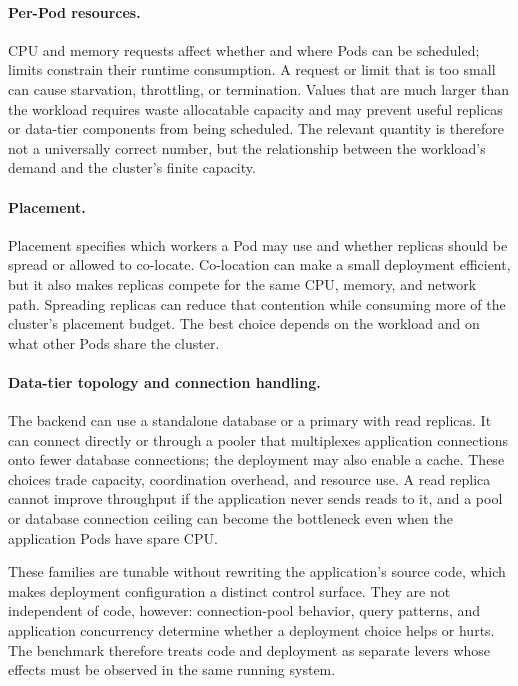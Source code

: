 \paragraph{Per-Pod resources.}
CPU and memory requests affect whether and where Pods can be scheduled;
limits constrain their runtime consumption. A request or limit that is too
small can cause starvation, throttling, or termination. Values that are much
larger than the workload requires waste allocatable capacity and may prevent
useful replicas or data-tier components from being scheduled. The relevant
quantity is therefore not a universally correct number, but the relationship
between the workload's demand and the cluster's finite capacity.

\paragraph{Placement.}
Placement specifies which workers a Pod may use and whether replicas should be
spread or allowed to co-locate. Co-location can make a small deployment
efficient, but it also makes replicas compete for the same CPU, memory, and
network path. Spreading replicas can reduce that contention while consuming
more of the cluster's placement budget. The best choice depends on the
workload and on what other Pods share the cluster.

\paragraph{Data-tier topology and connection handling.}
The backend can use a standalone database or a primary with read replicas. It
can connect directly or through a pooler that multiplexes application
connections onto fewer database connections; the deployment may also enable a
cache. These choices trade capacity, coordination overhead, and resource use.
A read replica cannot improve throughput if the application never sends reads
to it, and a pool or database connection ceiling can become the bottleneck
even when the application Pods have spare CPU.

These families are tunable without rewriting the application's source code,
which makes deployment configuration a distinct control surface. They are not
independent of code, however: connection-pool behavior, query patterns, and
application concurrency determine whether a deployment choice helps or hurts.
The benchmark therefore treats code and deployment as separate levers whose
effects must be observed in the same running system.


